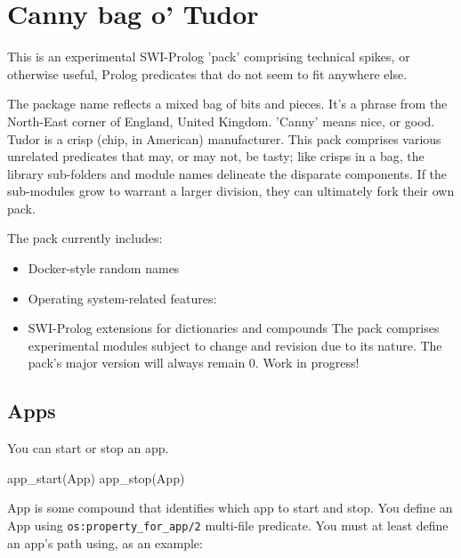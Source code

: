 
\chapter{Canny bag o' Tudor}

This is an experimental SWI-Prolog 'pack' comprising technical spikes, or
otherwise useful, Prolog predicates that do not seem to fit anywhere else.

The package name reflects a mixed bag of bits and pieces. It's a phrase from the
North-East corner of England, United Kingdom. 'Canny' means nice, or good. Tudor
is a crisp (chip, in American) manufacturer. This pack comprises various
unrelated predicates that may, or may not, be tasty; like crisps in a bag, the
library sub-folders and module names delineate the disparate components. If the
sub-modules grow to warrant a larger division, they can ultimately fork their
own pack.

The pack currently includes:

\begin{itemize}
    \item Docker-style random names
    \item Operating system-related features:


    \item SWI-Prolog extensions for dictionaries and compounds
The pack comprises experimental modules subject to change and revision
due to its nature. The pack's major version will always remain 0.
Work in progress!
\end{itemize}

\section{Apps}

You can start or stop an app.

\begin{code}
app_start(App)
app_stop(App)
\end{code}

App is some compound that identifies which app to start and stop. You define an
App using \verb$os:property_for_app/2$ multi-file predicate. You must at least define
an app's path using, as an example:


